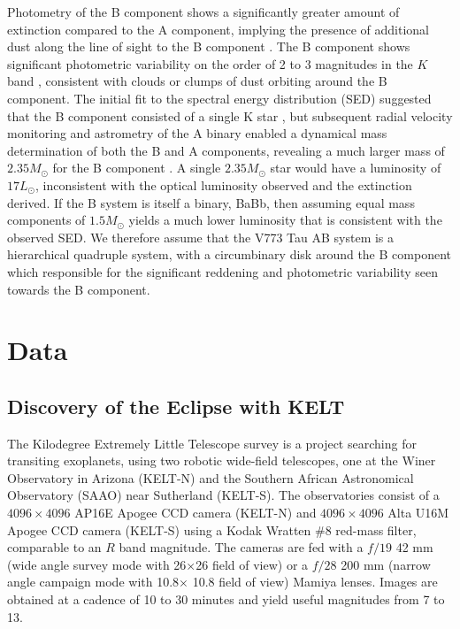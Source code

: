 \documentclass{aa}
\begin{document}
Photometry of the B component shows a significantly greater amount of extinction compared to the A component, implying the presence of additional dust along the line of sight to the B component \citep{Torres12}.
%
The B component shows significant photometric variability on the order of 2 to 3 magnitudes in the $K$ band \citep{Boden12}, consistent with clouds or clumps of dust orbiting around the B component.
%
The initial fit to the spectral energy distribution (SED) suggested that the B component consisted of a single K star \citep{Duchene03}, but subsequent radial velocity monitoring and astrometry of the A binary enabled a dynamical mass determination of both the B and A components, revealing a much larger mass of $2.35 M_\odot$ for the B component \citep{Boden12}.
%
A single $2.35 M_\odot$ star would have a luminosity of $17 L_\odot$, inconsistent with the optical luminosity observed and the extinction derived.
%
If the B system is itself a binary, BaBb, then assuming equal mass components of $1.5 M_\odot$ yields a much lower luminosity that is consistent with the observed SED.
%
We therefore assume that the V773 Tau AB system is a hierarchical quadruple system, with a circumbinary disk around the B component which responsible for the significant reddening and photometric variability seen towards the B component.

% 

\section{Data}\label{sec:data}

\subsection{Discovery of the Eclipse with KELT}

The Kilodegree Extremely Little Telescope \citep[KELT; ][]{Pepper07,Pepper12, Pepper2018} survey is a project searching for transiting exoplanets, using two robotic wide-field telescopes, one at the Winer Observatory in Arizona (KELT-N) and the Southern African Astronomical Observatory (SAAO) near Sutherland (KELT-S).
%
The observatories consist of a $4096\times 4096$ AP16E Apogee CCD camera (KELT-N) and $4096\times 4096$ Alta U16M Apogee CCD camera (KELT-S) using a Kodak Wratten \#8 red-mass filter, comparable to an $R$ band magnitude.
%
The cameras are fed with a $f/19$ 42 mm (wide angle survey mode with 26\degr{}$\times$26\degr{} field of view) or a $f/28$ 200 mm (narrow angle campaign mode with 10.8\degr{}$\times$ 10.8\degr{} field of view) Mamiya lenses.
%
Images are obtained at a cadence of 10 to 30 minutes and yield useful magnitudes from 7 to 13.
\end{document}
